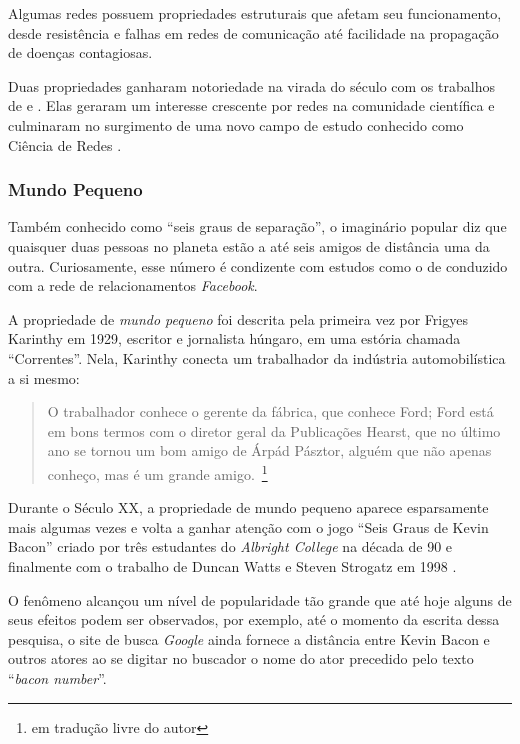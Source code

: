 \documentclass[12pt,a4paper]{article}
\theoremstyle{hypo}
\begin{document}
Algumas redes possuem propriedades estruturais que afetam seu funcionamento, desde resistência e falhas em redes de comunicação até facilidade na propagação de doenças contagiosas.

Duas propriedades ganharam notoriedade na virada do século com os trabalhos de  e . Elas geraram um interesse crescente por redes na comunidade científica e culminaram no surgimento de uma novo campo de estudo conhecido como Ciência de Redes \cite{Barabasi2016-rn}.

\subsubsection{Mundo Pequeno} \label{sec:small-world}

Também conhecido como \enquote{seis graus de separação}, o imaginário popular diz que quaisquer duas pessoas no planeta estão a até seis amigos de distância uma da outra. Curiosamente, esse número é condizente com estudos como o de  conduzido com a rede de relacionamentos \textit{Facebook}.

A propriedade de \textit{mundo pequeno} foi descrita pela primeira vez por Frigyes Karinthy em 1929, escritor e jornalista húngaro, em uma estória chamada \enquote{Correntes}. Nela, Karinthy conecta um trabalhador da indústria automobilística a si mesmo:

\blockcquote{Karinthy1929-jg}{O trabalhador conhece o gerente da fábrica, que conhece Ford; Ford está em bons termos com o diretor geral da Publicações Hearst, que no último ano se tornou um bom amigo de Árpád Pásztor, alguém que não apenas conheço, mas é um grande amigo.~\footnote{em tradução livre do autor}}

Durante o Século XX, a propriedade de mundo pequeno aparece esparsamente mais algumas vezes e volta a ganhar atenção com o jogo \enquote{Seis Graus de Kevin Bacon} criado por três estudantes do \textit{Albright College} na década de 90 e finalmente com o trabalho de Duncan Watts e Steven Strogatz em 1998 \cite{Barabasi2016-rn}.

O fenômeno alcançou um nível de popularidade tão grande que até hoje alguns de seus efeitos podem ser observados, por exemplo, até o momento da escrita dessa pesquisa, o site de busca \textit{Google} ainda fornece a distância entre Kevin Bacon e outros atores ao se digitar no buscador o nome do ator precedido pelo texto \enquote{\textit{bacon number}}.
\end{document}
